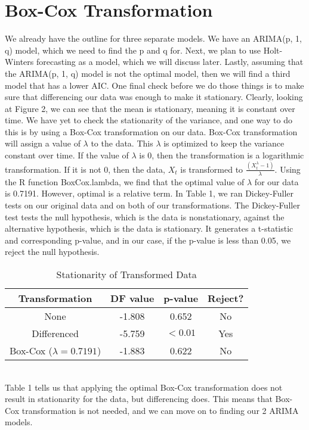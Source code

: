 \documentclass[12pt]{article}
\begin{document}
\section{Box-Cox Transformation}\label{sec:chapter}
We already have the outline for three separate models. We have an ARIMA(p, 1, q) model, which we need to find the p and q for. Next, we plan to use Holt-Winters forecasting as a model, which we will discuss later. Lastly, assuming that the ARIMA(p, 1, q) model is not the optimal model, then we will find a third model that has a lower AIC. One final check before we do those things is to make sure that differencing our data was enough to make it stationary. Clearly, looking at Figure 2, we can see that the mean is stationary, meaning it is constant over time. We have yet to check the stationarity of the variance, and one way to do this is by using a Box-Cox transformation on our data. Box-Cox transformation will assign a value of \(\lambda\) to the data. This \(\lambda\) is optimized to keep the variance constant over time. If the value of \(\lambda\) is 0, then the transformation is a logarithmic transformation. If it is not 0, then the data, \(X_t\) is transformed to \(\frac{(X_t^\lambda - 1)}{\lambda}\). Using the R function BoxCox.lambda, we find that the optimal value of \(\lambda\) for our data is 0.7191. However, optimal is a relative term. In Table 1, we ran Dickey-Fuller tests on our original data and on both of our transformations. The Dickey-Fuller test tests the null hypothesis, which is the data is nonstationary, against the alternative hypothesis, which is the data is stationary. It generates a t-statistic and corresponding p-value, and in our case, if the p-value is less than 0.05, we reject the null hypothesis.\\
\begin{table}[h]
\begin{center}
\begin{tabular}{ |c|c|c|c| } 
 \hline
 \textbf{Transformation} & \textbf{DF value} & \textbf{p-value} & \textbf{Reject?}\\
 \hline
 None & -1.808 & 0.652 & No\\ 
 \hline
 Differenced & -5.759 & \(< 0.01\) & Yes\\ 
 \hline
 Box-Cox (\(\lambda = 0.7191\)) & -1.883 & 0.622 & No\\ 
 \hline
\end{tabular}
\caption{Stationarity of Transformed Data}
\label{table:Table 1}
\end{center}
\end{table}\\
Table 1 tells us that applying the optimal Box-Cox transformation does not result in stationarity for the data, but differencing does. This means that Box-Cox transformation is not needed, and we can move on to finding our 2 ARIMA models.\\
\end{document}
